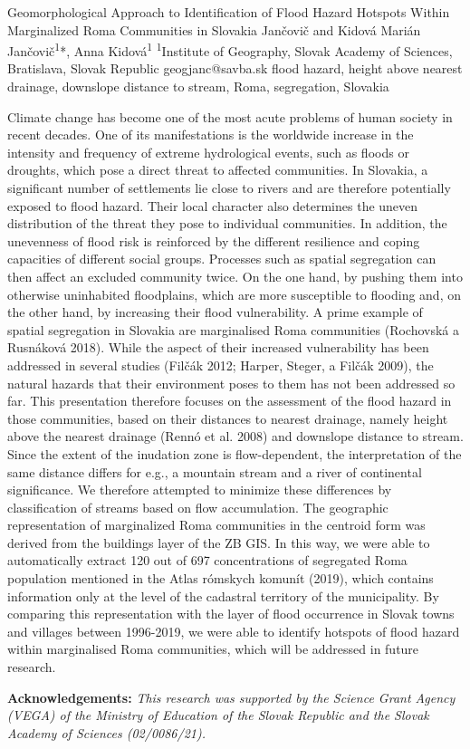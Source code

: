 \abstract
{Geomorphological Approach to Identification of Flood Hazard Hotspots Within Marginalized Roma Communities in Slovakia} %
{Jančovič and Kidová} %
{Marián Jančovič\textsuperscript{1}*, Anna Kidová\textsuperscript{1}} %
{\TLtag} %
{\textsuperscript{1}Institute of Geography, Slovak Academy of Sciences, Bratislava, Slovak Republic
} %
{geogjanc@savba.sk}  %
{flood hazard, height above nearest drainage, downslope distance to stream, Roma, segregation, Slovakia}%
{Climate change has become one of the most acute problems of human society in recent decades. One of its manifestations is the worldwide increase in the intensity and frequency of extreme hydrological events, such as floods or droughts, which pose a direct threat to affected communities. In Slovakia, a significant number of settlements lie close to rivers and are therefore potentially exposed to flood hazard. Their local character also determines the uneven distribution of the threat they pose to individual communities. In addition, the unevenness of flood risk is reinforced by the different resilience and coping capacities of different social groups. Processes such as spatial segregation can then affect an excluded community twice. On the one hand, by pushing them into otherwise uninhabited floodplains, which are more susceptible to flooding and, on the other hand, by increasing their flood vulnerability. A prime example of spatial segregation in Slovakia are marginalised Roma communities (Rochovská a Rusnáková 2018). While the aspect of their increased vulnerability has been addressed in several studies (Filčák 2012; Harper, Steger, a Filčák 2009), the natural hazards that their environment poses to them has not been addressed so far. This presentation therefore focuses on the assessment of the flood hazard in those communities, based on their distances to nearest drainage, namely height above the nearest drainage (Rennó et al. 2008) and downslope distance to stream. Since the extent of the inudation zone is flow-dependent, the interpretation of the same distance differs for e.g., a mountain stream and a river of continental significance. We therefore attempted to minimize these differences by classification of streams based on flow accumulation. The geographic representation of marginalized Roma communities in the centroid form was derived from the buildings layer of the ZB GIS. In this way, we were able to automatically extract 120 out of 697 concentrations of segregated Roma population mentioned in the Atlas rómskych komunít (2019), which contains information only at the level of the cadastral territory of the municipality. By comparing this representation with the layer of flood occurrence in Slovak towns and villages between 1996-2019, we were able to identify hotspots of flood hazard within marginalised Roma communities, which will be addressed in future research.

\vspace{0.5em}
\noindent
\textbf{Acknowledgements:}	
\textit{This research was supported by the Science Grant Agency (VEGA) of the Ministry of Education of the Slovak Republic and the Slovak Academy of Sciences (02/0086/21).}
}%
